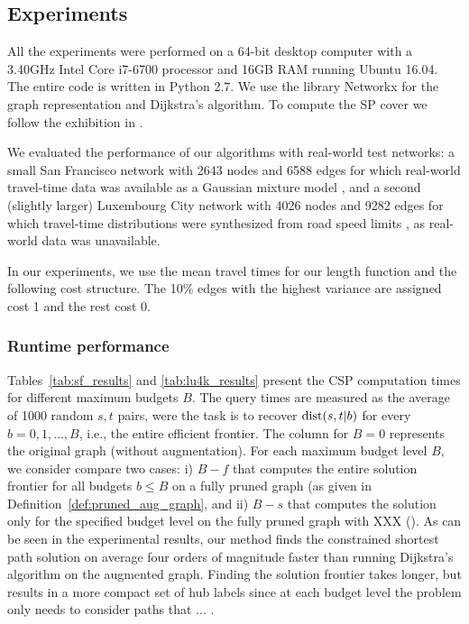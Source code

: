 \subsection{Experiments}

All the experiments were performed on a 64-bit desktop computer with a 3.40GHz Intel Core i7-6700 processor and 16GB RAM running Ubuntu 16.04.
The entire code is written in Python 2.7. We use the library Networkx for the graph representation and Dijkstra's algorithm.
To compute the SP cover we follow the exhibition in \cite{hubimplem}.

We evaluated the performance of our algorithms with real-world test networks: a small San Francisco network with 2643 nodes and 6588 edges for which real-world travel-time data was available as a Gaussian mixture model \cite{sf_data}, and a second (slightly larger) Luxembourg City network with 4026 nodes and 9282 edges for which travel-time distributions were synthesized from road speed limits \cite{niknami2016tractable}, as real-world data was unavailable.
 
In our experiments, we use the mean travel times for our length function and the following cost structure. The 10\% edges with the highest variance are assigned cost 1 and the rest cost 0.

\subsubsection{Runtime performance}


Tables~\ref{tab:sf_results} and \ref{tab:lu4k_results} present the CSP computation times for different maximum budgets $B$. The query times are measured as the average of 1000 random $s,t$ pairs, were the task is to recover $\text{dist}(s,t|b)$ for every $b=0,1,\ldots,B$, i.e., the entire efficient frontier.  The column for $B=0$ represents the original graph (without augmentation). For each maximum budget level $B$, we consider compare two cases: i) $B-f$ that computes the entire solution frontier for all budgets $b\leq B$ on a fully pruned graph (as given in Definition~\ref{def:pruned_aug_graph}, and ii) $B-s$ that computes the solution only for the specified budget level on the fully pruned graph with XXX (). As can be seen in the experimental results, our method finds the constrained shortest path solution on average four orders of magnitude faster than running Dijkstra's algorithm on the augmented graph. Finding the solution frontier takes longer, but results in a more compact set of hub labels since at each budget level the problem only needs to consider paths that ... . 

